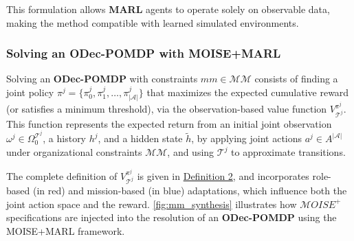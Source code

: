 \documentclass[pdflatex,sn-mathphys-num]{sn-jnl}%
\theoremstyle{thmstyleone}%
\theoremstyle{thmstyletwo}%
\theoremstyle{thmstylethree}%
\begin{document}
\noindent This formulation allows \textbf{MARL} agents to operate solely on observable data, making the method compatible with learned simulated environments.

\subsubsection*{Solving an \textbf{ODec-POMDP} with MOISE+MARL}

Solving an \textbf{ODec-POMDP} with constraints $mm \in \mathcal{MM}$ consists of finding a joint policy $\pi^j = \{\pi^j_0, \pi^j_1, \dots, \pi^j_{|\mathcal{A}|}\}$ that maximizes the expected cumulative reward (or satisfies a minimum threshold), via the observation-based value function $V_{\mathcal{T}^j}^{\pi^j}$. This function represents the expected return from an initial joint observation $\omega^j \in \Omega^{\mathcal{T}^j} _0$, a history $h^j$, and a hidden state $\tilde{h}$, by applying joint actions $a^j \in A^{|\mathcal{A}|}$ under organizational constraints $\mathcal{MM}$, and using $\mathcal{T}^j$ to approximate transitions.

The complete definition of $V_{\mathcal{T}^j}^{\pi^j}$ is given in \hyperref[eq:single_value_function_parallel]{Definition 2}, and incorporates role-based (in red) and mission-based (in blue) adaptations, which influence both the joint action space and the reward. \autoref{fig:mm_synthesis} illustrates how $\mathcal{M}OISE^+$ specifications are injected into the resolution of an \textbf{ODec-POMDP} using the MOISE+MARL framework.

\medskip
\end{document}

